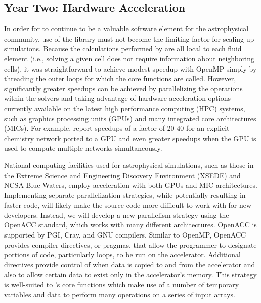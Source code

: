 \subsection{Year Two: Hardware Acceleration}

In order for \grackle{} to continue to be a valuable software element
for the astrophysical community, use of the library must not become
the limiting factor for scaling up simulations.  Because the
calculations performed by \grackle{} are all local to each fluid
element (i.e., solving a given cell does not require information about
neighboring cells), it was straightforward to achieve modest speedup
with OpenMP simply by threading the outer loops for which the core
functions are called.  However, significantly greater speedups can be
achieved by parallelizing the operations within the solvers and taking
advantage of hardware acceleration options currently available on the
latest high performance computing (HPC) systems, such as graphics
processing units (GPUs) and many integrated core architectures (MICs).
For example, \citet{Haidar2016PerformanceAA} report speedups of a
factor of 20-40
for an explicit chemistry network ported to a GPU and even greater
speedups when the GPU is used to compute multiple networks
simultaneously.

National computing facilities used for astrophysical simulations, such
as those in the Extreme Science and Engineering Discovery Environment
(XSEDE) and NCSA Blue Waters, employ acceleration with both GPUs and
MIC architectures.  Implementing separate parallelization strategies,
while potentially resulting in faster code, will likely make the
source code more difficult to work with for new developers.  Instead,
we will develop a new parallelism strategy using the OpenACC standard,
which works with many different architectures.  OpenACC is supported
by PGI, Cray, and GNU compilers.  Similar to OpenMP, OpenACC provides
compiler directives, or pragmas, that allow the programmer to
designate portions of code, particularly loops, to be run on the
accelerator.  Additional directives provide control of when data is
copied to and from the accelerator and also to allow certain data to
exist only in the accelerator's memory.  This strategy is well-suited
to \grackle{}'s core functions which make use of a number of temporary
variables and data to perform many operations on a series of input
arrays.


